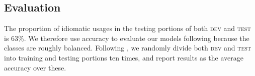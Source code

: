 \documentclass[11pt,a4paper]{article}
\newcommand{\dev}{\textsc{dev}\xspace}
\newcommand{\test}{\textsc{test}\xspace}
\begin{document}


\subsection{Evaluation}\label{eval}

The proportion of idiomatic usages in the testing portions of both
\dev and \test is 63\%. We therefore use accuracy to evaluate our
models following \cite{Fazly2009} because the classes are roughly
balanced.  Following , we randomly
divide both \dev and \test into training and testing portions ten
times, and report results as the average accuracy over these.




\end{document}
